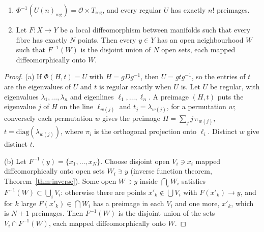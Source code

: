 \begin{lemma}\label{lem:sheets}
\begin{enumerate}
\item[(a)] $\Phi^{-1}(U(n)_{\mathrm{reg}})=\mathcal O\times T_{\mathrm{reg}}$, and every regular $U$ has exactly $n!$ preimages.
\item[(b)] Let $F\colon X\to Y$ be a local diffeomorphism between manifolds such that every fibre has exactly $N$ points. Then every $y\in Y$ has an open neighbourhood $W$ such that $F^{-1}(W)$
is the disjoint union of $N$ open sets, each mapped diffeomorphically onto $W$.
\end{enumerate}
\end{lemma}

\begin{proof}
(a) If $\Phi(H,t)=U$ with $H=gDg^{-1}$, then $U=gtg^{-1}$, so the entries of $t$ are the eigenvalues of $U$ and $t$ is regular exactly when $U$ is. Let $U$ be regular, with eigenvalues $\lambda_1,\dots,\lambda_n$
and eigenlines $\ell_1,\dots,\ell_n$. A preimage $(H,t)$ puts the eigenvalue $j$ of $H$ on the line $\ell_{w(j)}$ and $t_j=\lambda_{w(j)}$, for a permutation $w$; conversely each permutation $w$
gives the preimage $H=\sum_jj\,\pi_{w(j)}$, $t=\mathrm{diag}(\lambda_{w(j)})$, where $\pi_i$ is the orthogonal projection onto $\ell_i$. Distinct $w$ give distinct $t$.

(b) Let $F^{-1}(y)=\{x_1,\dots,x_N\}$. Choose disjoint open $V_i\ni x_i$ mapped diffeomorphically onto open sets $W_i\ni y$ (inverse function theorem, Theorem~\ref{thm:inverse}). Some open $W\ni y$ inside
$\bigcap_iW_i$ satisfies $F^{-1}(W)\subset\bigcup_iV_i$: otherwise there are points $x'_k\notin\bigcup V_i$ with $F(x'_k)\to y$, and for $k$ large $F(x'_k)\in\bigcap W_i$ has a preimage in each $V_i$ and
one more, $x'_k$, which is $N+1$ preimages. Then $F^{-1}(W)$ is the disjoint union of the sets $V_i\cap F^{-1}(W)$, each mapped diffeomorphically onto $W$.
\end{proof}

